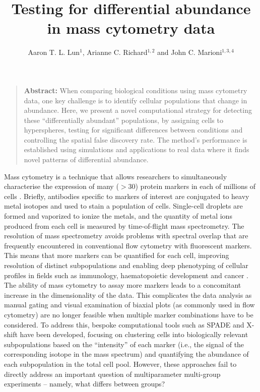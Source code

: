 \documentclass{article}
\title{Testing for differential abundance in mass cytometry data}
\author{Aaron T. L. Lun$^{1}$, Arianne C. Richard$^{1,2}$ and John C. Marioni$^{1,3,4}$}
\date{
\begin{minipage}{0.9\textwidth}
\begin{flushleft} 
\begin{small}
$^1$Cancer Research UK Cambridge Institute, University of Cambridge, Li Ka Shing Centre, Robinson Way, Cambridge CB2 0RE, United Kingdom \\
$^2$Cambridge Institute for Medical Research,  University of Cambridge, Wellcome Trust/MRC Building, Hills Road, Cambridge CB2 0XY, United Kingdom \\
$^3$EMBL European Bioinformatics Institute, Wellcome Genome Campus, Hinxton, Cambridge CB10 1SD, United Kingdom \\
$^4$Wellcome Trust Sanger Institute, Wellcome Genome Campus, Hinxton, Cambridge CB10 1SA, United Kingdom \\
\end{small}
\end{flushleft}
\end{minipage}\\[0.2in]
\today{}
}
\begin{document}
\maketitle

\begin{quote}
\textbf{Abstract:} 
When comparing biological conditions using mass cytometry data, one key challenge is to identify cellular populations that change in abundance. 
Here, we present a novel computational strategy for detecting these ``differentially abundant'' populations, by assigning cells to hyperspheres, testing for significant differences between conditions and controlling the spatial false discovery rate. 
The method's performance is established using simulations and applications to real data where it finds novel patterns of differential abundance.
\end{quote}

\noindent
Mass cytometry is a technique that allows researchers to simultaneously characterise the expression of many ($>30$) protein markers in each of millions of cells \cite{ornatsky2008study}.
Briefly, antibodies specific to markers of interest are conjugated to heavy metal isotopes and used to stain a population of cells.
Single-cell droplets are formed and vaporized to ionize the metals, and the quantity of metal ions produced from each cell is measured by time-of-flight mass spectrometry.
The resolution of mass spectrometry avoids problems with spectral overlap that are frequently encountered in conventional flow cytometry with fluorescent markers.
This means that more markers can be quantified for each cell, improving resolution of distinct subpopulations and enabling deep phenotyping of cellular profiles in fields such as immunology, haematopoietic development and cancer \cite{leipold2015multiparameter,leelatian2015characterizing,hansmann2015mass,bendall2011singlecell,levine2015datadriven}.
The ability of mass cytometry to assay more markers leads to a concomitant increase in the dimensionality of the data.
This complicates the data analysis as manual gating and visual examination of biaxial plots (as commonly used in flow cytometry) are no longer feasible when multiple marker combinations have to be considered.
To address this, bespoke computational tools such as SPADE \cite{qiu2011extracting} and X-shift \cite{samusik2016automated} have been developed, focusing on clustering cells into biologically relevant subpopulations based on the ``intensity'' of each marker (i.e., the signal of the corresponding isotope in the mass spectrum) and quantifying the abundance of each subpopulation in the total cell pool.
However, these approaches fail to directly address an important question of multiparameter multi-group experiments -- namely, what differs between groups?
\end{document}
